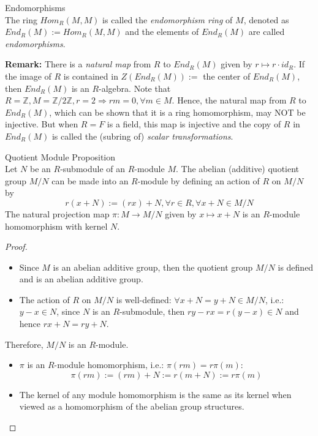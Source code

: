 \begin{definition}{Endomorphisms}\\
The ring $Hom_R(M,M)$ is called the \textit{endomorphism ring} of $M$, denoted as $End_R(M):= Hom_R(M,M)$ and the elements of $End_R(M)$ are called \textit{endomorphisms}.
\end{definition}

\noindent\textbf{Remark:} There is a \textit{natural map} from $R$ to $End_R(M)$ given by $r \mapsto r\cdot id_R$. If the image of $R$ is contained in $Z(End_R(M)):=$ the center of $End_R(M)$, then $End_R(M)$ is an $R$-algebra. Note that $R=\mathbb{Z},M=\mathbb{Z}/2\mathbb{Z},r=2 \Rightarrow rm=0, \forall m\in M$. Hence, the natural map from $R$ to $End_R(M)$, which can be shown that it is a ring homomorphism, may NOT be injective. But when $R=F$ is a field, this map is injective and the copy of $R$ in $End_R(M)$ is called the (subring of) \textit{scalar transformations}.

\begin{proposition}{Quotient Module Proposition}\\
Let $N$ be an $R$-submodule of an $R$-module $M$. The abelian (additive) quotient group $M/N$ can be made into an $R$-module by defining an action of $R$ on $M/N$ by
$$r(x+N) := (rx) +N,\forall r\in R,\forall x+N \in M/N$$
The natural projection map $\pi: M\to M/N$ given by $x \mapsto x+N$ is an $R$-module homomorphism with kernel $N$.
\end{proposition}

\begin{proof}
    \begin{itemize}
        \item Since $M$ is an abelian additive group, then the quotient group $M/N$ is defined and is an abelian additive group.
        \item The action of $R$ on $M/N$ is well-defined: $\forall x+N=y +N \in M/N$, i.e.: $y-x\in N$, since $N$ is an $R$-submodule, then $ry -rx= r(y-x) \in N$ and hence $rx+N = ry+N$.
    \end{itemize}
    Therefore, $M/N$ is an $R$-module.
    \begin{itemize}
        \item $\pi$ is an $R$-module homomorphism, i.e.: $\pi(rm) = r\pi(m)$:
        $$\pi(rm) := (rm)+N := r(m+N) := r\pi(m)$$
        \item The kernel of any module homomorphism is the same as its kernel when viewed as a homomorphism of the abelian group structures.
    \end{itemize}
\end{proof}

